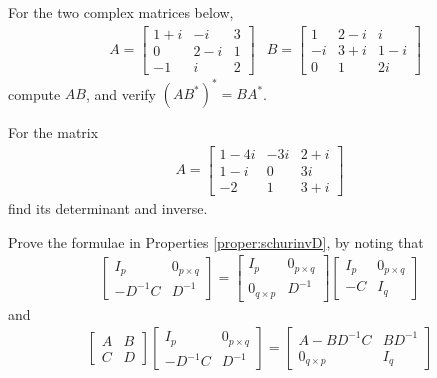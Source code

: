 \begin{Exercise}
For the two complex matrices below,
\begin{align*}
& A=
\begin{bmatrix}
1+i & -i & 3 \\
0 & 2-i & 1 \\
-1 & i & 2
\end{bmatrix}
& B=
\begin{bmatrix}
1 & 2-i & i \\
-i & 3+i & 1-i \\
0 & 1 & 2i
\end{bmatrix}
\end{align*}
compute $AB$, and verify $(AB^*)^* = BA^*$.
\end{Exercise}

\begin{Exercise}
For the matrix
\begin{align*}
A=
\begin{bmatrix}
1-4i & -3i & 2+i \\
1-i & 0 & 3i \\
-2 & 1 & 3+i
\end{bmatrix}    
\end{align*}
find its determinant and inverse.
\end{Exercise}

\begin{Exercise}
\label{ex:schurinvD}
Prove the formulae in Properties \ref{proper:schurinvD}, by noting that
\begin{align*}
\begin{bmatrix}
I_p & 0_{p \times q} \\
-D^{-1}C & D^{-1}
\end{bmatrix}  
=
\begin{bmatrix}
I_p & 0_{p \times q} \\
0_{q \times p} & D^{-1}
\end{bmatrix} 
\begin{bmatrix}
I_p & 0_{p \times q} \\
-C & I_q
\end{bmatrix} 
\end{align*}
and
\begin{align*}
\begin{bmatrix}
A & B \\
C & D
\end{bmatrix}
\begin{bmatrix}
I_p & 0_{p \times q} \\
-D^{-1}C & D^{-1}
\end{bmatrix} =
\begin{bmatrix}
A - BD^{-1}C & BD^{-1} \\
0_{q \times p} & I_q
\end{bmatrix}
\end{align*}
\end{Exercise}

